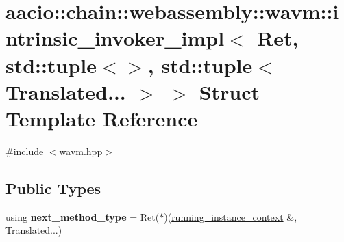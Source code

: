 \hypertarget{structaacio_1_1chain_1_1webassembly_1_1wavm_1_1intrinsic__invoker__impl_3_01_ret_00_01std_1_1tupc2f9a1e0a8d32bb22e7244f2be71510b}{}\section{aacio\+:\+:chain\+:\+:webassembly\+:\+:wavm\+:\+:intrinsic\+\_\+invoker\+\_\+impl$<$ Ret, std\+:\+:tuple$<$$>$, std\+:\+:tuple$<$ Translated... $>$ $>$ Struct Template Reference}
\label{structaacio_1_1chain_1_1webassembly_1_1wavm_1_1intrinsic__invoker__impl_3_01_ret_00_01std_1_1tupc2f9a1e0a8d32bb22e7244f2be71510b}


{\ttfamily \#include $<$wavm.\+hpp$>$}

\subsection*{Public Types}
\begin{DoxyCompactItemize}
\item 
\mbox{\label{structaacio_1_1chain_1_1webassembly_1_1wavm_1_1intrinsic__invoker__impl_3_01_ret_00_01std_1_1tupc2f9a1e0a8d32bb22e7244f2be71510b_ad9aefb96dee8fb5cb00fd0269cb5e32f}} 
using {\bfseries next\+\_\+method\+\_\+type} = Ret($\ast$)(\mbox{\hyperlink{structaacio_1_1chain_1_1webassembly_1_1wavm_1_1running__instance__context}{running\+\_\+instance\+\_\+context}} \&, Translated...)
\end{DoxyCompactItemize}
